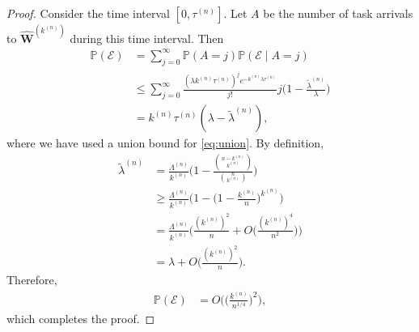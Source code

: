 \documentclass[sigconf]{acmart}
\renewcommand{\Pr}{\mathbb{P}} %
\newcommand{\supn}{^{(n)}}
\begin{document}
\begin{proof}
Consider the time interval $[0,\tau\supn]$. Let $A$ be the number of task arrivals to $\hat{\bm{W}}^{(k\supn)}$ during this time interval. Then
\begin{align}
\Pr(\mathcal{E})
&=\sum_{j=0}^{\infty}\Pr(A=j)\Pr(\mathcal{E}\mid A=j)\nonumber\\
&\le\sum_{j=0}^{\infty}\frac{(\lambda k\supn\tau\supn
)^je^{-k\supn\lambda\tau\supn}}{j!}j\biggl(1-\frac{\widetilde{\lambda}\supn}{\lambda}\biggr)\label{eq:union}\\
&= k\supn\tau\supn(\lambda-\widetilde{\lambda}\supn),\nonumber
\end{align}
where we have used a union bound for \eqref{eq:union}. By definition,
\begin{align*}
\widetilde{\lambda}\supn&=\frac{\Lambda\supn}{ k\supn}\Biggl(1-\frac{\binom{n-k\supn}{k\supn}}{\binom{n}{k\supn}}\Biggr)\\
&\ge \frac{\Lambda\supn}{ k\supn}\Biggl(1-\biggl(1-\frac{k\supn}{n}\biggr)^{k\supn}\Biggr)\\
&=\frac{\Lambda\supn}{ k\supn}\biggl(\frac{(k\supn)^2}{n}+O\biggl(\frac{(k\supn)^4}{n^2}\biggr)\biggr)\\
&=\lambda+O\biggl(\frac{(k\supn)^2}{n}\biggr).
\end{align*}
Therefore,
\begin{align*}
\Pr(\mathcal{E})
&= O\Biggl(\biggl(\frac{k\supn}{n^{1/4}}\biggr)^2\Biggr),
\end{align*}
which completes the proof.
\end{proof}
\end{document}
